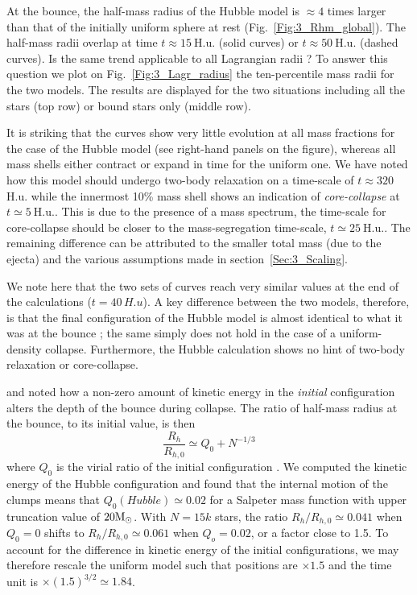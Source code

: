 At the bounce, the half-mass radius of the Hubble model is $\approx 4$ times larger than that of the initially uniform sphere at rest (Fig.~\ref{Fig:3_Rhm_global}). The half-mass radii overlap at time $t \approx 15~$H.u. (solid curves) or $t \approx 50~$H.u. (dashed curves). Is the same trend applicable to all Lagrangian radii ? To answer this question we plot on Fig.~\ref{Fig:3_Lagr_radius} the ten-percentile mass radii for the two models. The results are displayed for the two situations including all the stars (top row) or bound stars only (middle row). 

It is striking that the curves show very little evolution at all mass fractions for the case of the Hubble model (see right-hand panels on the figure), whereas all mass shells either contract or expand in time for the uniform one. We have noted how this model should undergo two-body relaxation on a time-scale of $t \approx 320~$H.u. while the innermost 10\% mass shell shows an  indication of \textit{core-collapse} at $t \simeq 5~$H.u.. This is due to the presence of a mass spectrum, the time-scale for core-collapse should be closer to the mass-segregation time-scale,  $t \simeq 25~$H.u.. The remaining difference can be attributed to the smaller total mass (due to the ejecta) and the various assumptions made in section~\ref{Sec:3_Scaling}.

We note here that the two sets of curves reach very similar values at the end of the calculations ($t = 40\, H.u$). A key difference between the two models, therefore, is that the final configuration of the Hubble model is almost identical to what it was at the bounce ; the same simply does not hold in the case of a uniform-density collapse. Furthermore, the Hubble calculation shows no hint of two-body relaxation or core-collapse.

\cite{Caputo2014} and \cite{Theis1999} noted how a non-zero amount of kinetic energy in the {\it initial} configuration alters the  depth of the bounce during collapse. The ratio of half-mass radius at the bounce, to its initial value, is then
\begin{equation}
\frac{R_h}{R_{h,0}} \simeq Q_0 + N^{-1/3}
\end{equation} 
 where $Q_0$ is the virial ratio of the initial configuration \citep[see][Fig.5]{Caputo2014}. We computed the kinetic energy of the  Hubble configuration and found that the internal motion of the clumps means that $Q_0 (Hubble) \simeq 0.02$ for a Salpeter mass function with upper truncation value of $20 {\textrm{M}_\odot}$. With $N = 15k$ stars, the ratio $R_h/R_{h,0} \simeq 0.041$ when $Q_0 = 0$ shifts to $R_h/R_{h,0} \simeq 0.061$ when $Q_o = 0.02$, or a factor close to 1.5. To account for the difference in kinetic energy of the initial configurations, we may therefore rescale the uniform model such that positions are  $ \times 1.5$ and the time unit is $\times (1.5)^{3/2} \simeq 1.84$.
 
